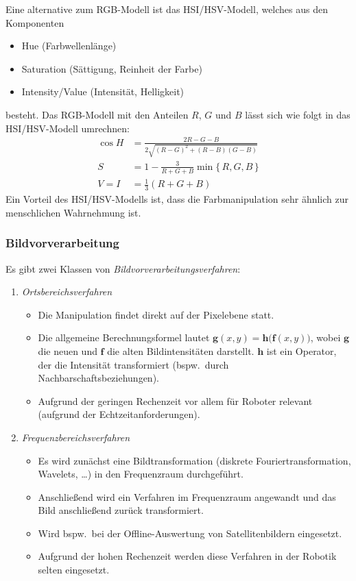 \documentclass[a4paper, 11pt, accentcolor = tud3b]{tudreport}
\renewcommand{\vec}[1]{\boldsymbol{#1}}
\newcommand{\bspw}{bspw.~}
\begin{document}
					Eine alternative zum RGB-Modell ist das HSI/HSV-Modell, welches aus den Komponenten
					\begin{itemize}
						\item Hue (Farbwellenlänge)
						\item Saturation (Sättigung, Reinheit der Farbe)
						\item Intensity/Value (Intensität, Helligkeit)
					\end{itemize}
					besteht. Das RGB-Modell mit den Anteilen \(R\), \(G\) und \(B\) lässt sich wie folgt in das HSI/HSV-Modell umrechnen:
					\begin{align*}
						\cos H & = \frac{2R - G - B}{2\sqrt{(R - G)^2 + (R - B)(G - B)}} \\
						S      & = 1 - \frac{3}{R + G + B} \min \{\, R, G, B \,\}        \\
						V = I  & = \frac{1}{3} (R + G + B)
					\end{align*}
					Ein Vorteil des HSI/HSV-Modells ist, dass die Farbmanipulation sehr ähnlich zur menschlichen Wahrnehmung ist.

				\subsubsection{Bildvorverarbeitung}
					Es gibt zwei Klassen von \emph{Bildvorverarbeitungsverfahren}:
					\begin{enumerate}
						\item \emph{Ortsbereichsverfahren}
							\begin{itemize}
								\item Die Manipulation findet direkt auf der Pixelebene statt.
								\item Die allgemeine Berechnungsformel lautet \( \vec{g}(x, y) = \vec{h}\big(\vec{f}(x, y)\big) \), wobei \(\vec{g}\) die neuen und \(\vec{f}\) die alten Bildintensitäten darstellt. \(\vec{h}\) ist ein Operator, der die Intensität transformiert (\bspw durch Nachbarschaftsbeziehungen).
								\item Aufgrund der geringen Rechenzeit vor allem für Roboter relevant (aufgrund der Echtzeitanforderungen).
							\end{itemize}
						\item \emph{Frequenzbereichsverfahren}
							\begin{itemize}
								\item Es wird zunächst eine Bildtransformation (diskrete Fouriertransformation, Wavelets, \dots) in den Frequenzraum durchgeführt.
								\item Anschließend wird ein Verfahren im Frequenzraum angewandt und das Bild anschließend zurück transformiert.
								\item Wird \bspw bei der Offline-Auswertung von Satellitenbildern eingesetzt.
								\item Aufgrund der hohen Rechenzeit werden diese Verfahren in der Robotik selten eingesetzt.
							\end{itemize}
					\end{enumerate}
\end{document}
